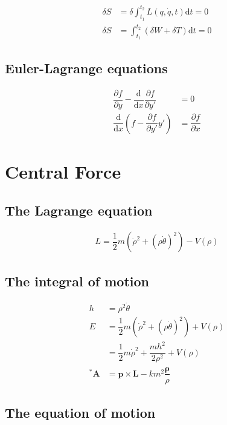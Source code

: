 \documentclass[10pt, a4paper]{article}
\def\D{\partial}
\begin{document}
\begin{multicols}{2}
	\begin{align}
		\delta S &= \delta \int^{t_2}_{t_1} L(q, \dot{q}, t) \mathrm{d} t = 0\\
		\delta S &= \int^{t_2}_{t_1} (\delta W + \delta T) \mathrm{d} t = 0
	\end{align}
	
\subsection{Euler-Lagrange equations}

	\begin{align}
		\dfrac{\D f}{\D y} - \dfrac{\mathrm{d}}{\mathrm{d} x} \dfrac{\D f}{\D y'} &= 0\\
		\dfrac{\mathrm{d}}{\mathrm{d} x}\left(f - \dfrac{\D f}{\D y'} y' \right) &= \dfrac{\D f}{\D x}
	\end{align}

\section{Central Force}

\subsection{The Lagrange equation}

	\begin{align}
		L = \dfrac{1}{2} m \left(\dot{\rho}^2 + (\rho \dot{\theta})^2\right) - V(\rho)
	\end{align}
	
\subsection{The integral of motion}

	\begin{align}
		h &= \rho^2\dot{\theta}\\
		E &= \dfrac{1}{2} m \left(\dot{\rho}^2 + (\rho \dot{\theta})^2\right) + V(\rho)\\
		&= \dfrac{1}{2} m \dot{\rho}^2 + \dfrac{mh^2}{2\rho^2} + V(\rho)\\
		^*\bm{A} &= \bm{p} \times \bm{L} - km^2 \dfrac{\bm{\rho}}{\rho}
	\end{align}

\subsection{The equation of motion}
	

\end{multicols}
\end{document}
